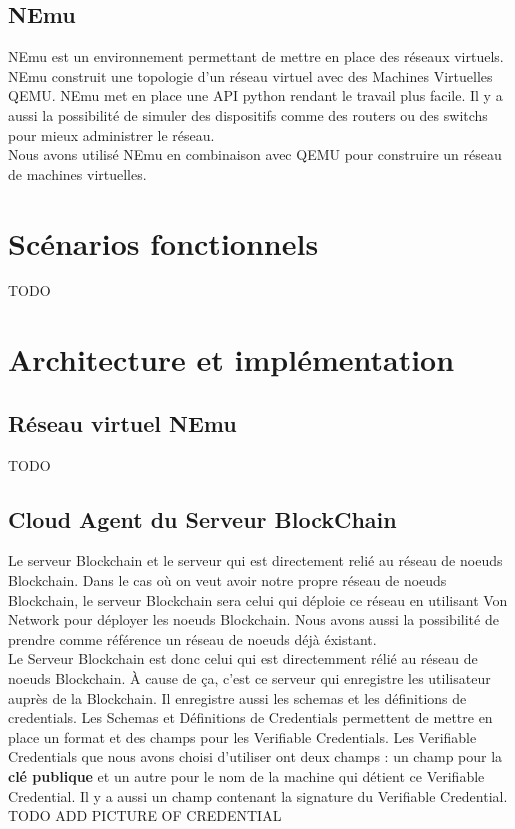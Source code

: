 \documentclass[12pt, openany]{report}
\begin{document}
\subsection{NEmu}
\noindent 
\begin{flushleft}
NEmu est un environnement permettant de mettre en place des réseaux virtuels. NEmu construit une topologie d'un réseau virtuel avec des Machines Virtuelles QEMU. NEmu met en place une API python rendant le travail plus facile. Il y a aussi la possibilité de simuler des dispositifs comme des routers ou des switchs pour mieux administrer le réseau. \\
Nous avons utilisé NEmu en combinaison avec QEMU pour construire un réseau de machines virtuelles.
\end{flushleft}

\section{Scénarios fonctionnels}
\noindent 
\begin{flushleft}
TODO
\end{flushleft}

\section{Architecture et implémentation}

\subsection{Réseau virtuel NEmu}
\noindent 
\begin{flushleft}
TODO
\end{flushleft}

\subsection{Cloud Agent du Serveur BlockChain}
\noindent 
\begin{flushleft}
Le serveur Blockchain et le serveur qui est directement relié au réseau de noeuds Blockchain.  Dans le cas où on veut avoir notre propre réseau de noeuds Blockchain, le serveur Blockchain sera celui qui déploie ce réseau en utilisant Von Network pour déployer les noeuds Blockchain. Nous avons aussi la possibilité de prendre comme référence un réseau de noeuds déjà éxistant. \\
Le Serveur Blockchain est donc celui qui est directemment rélié au réseau de noeuds Blockchain. À cause de ça, c'est ce serveur qui enregistre les utilisateur auprès de la Blockchain. Il enregistre aussi les schemas et les définitions de credentials. Les Schemas et Définitions de Credentials permettent de mettre en place un format et des champs pour les Verifiable Credentials. Les Verifiable Credentials que nous avons choisi d'utiliser ont deux champs : un champ pour la \textbf{clé publique} et un autre pour le nom de la machine qui détient ce Verifiable Credential. Il y a aussi un champ contenant la signature du Verifiable Credential.\\
TODO ADD PICTURE OF CREDENTIAL

\end{flushleft}
\end{document}

